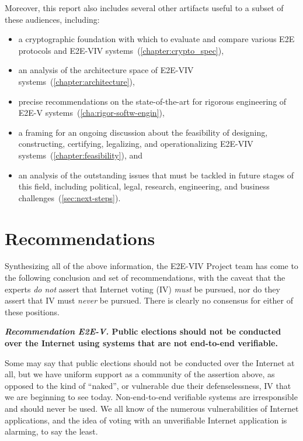Moreover, this report also includes several other artifacts useful to
a subset of these audiences, including:
\begin{itemize}
\item a cryptographic foundation with which to evaluate and compare
  various E2E protocols and E2E-VIV
  systems~(\autoref{chapter:crypto_spec}),
\item an analysis of the architecture space of E2E-VIV
  systems~(\autoref{chapter:architecture}),
\item precise recommendations on the state-of-the-art for rigorous
  engineering of E2E-V systems~(\autoref{cha:rigor-softw-engin}),
\item a framing for an ongoing discussion about the feasibility of
  designing, constructing, certifying, legalizing, and operationalizing
  E2E-VIV systems~(\autoref{chapter:feasibility}), and
\item an analysis of the outstanding issues that must be tackled in
  future stages of this field, including political, legal, research,
  engineering, and business challenges~(\autoref{sec:next-steps}).
\end{itemize}

\section{Recommendations}

Synthesizing all of the above information, the E2E-VIV Project team
has come to the following conclusion and set of recommendations, with
the caveat that the experts \emph{do not} assert that Internet voting
(IV) \emph{must} be pursued, nor do they assert that IV must
\emph{never} be pursued. There is clearly no consensus for either of
these positions.

\begin{center}
  \textbf{\emph{Recommendation E2E-V.} Public elections should not be
    conducted over the Internet using systems that are not end-to-end
    verifiable.}
\end{center}

Some may say that public elections should not be conducted over the
Internet at all, but we have uniform support as a community of the
assertion above, as opposed to the kind of ``naked'', or vulnerable
due their defenselessness, IV that we are beginning to see
today. Non-end-to-end verifiable systems are irresponsible and should
never be used. We all know of the numerous vulnerabilities of Internet
applications, and the idea of voting with an unverifiable Internet
application is alarming, to say the least.

